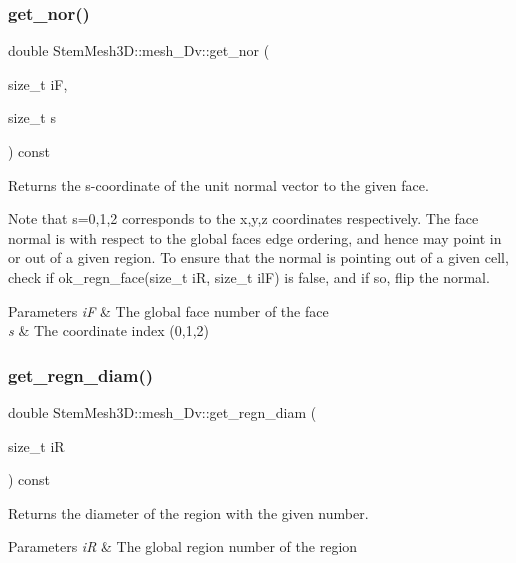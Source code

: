 \subsubsection{\texorpdfstring{get\+\_\+nor()}{get\_nor()}}
{\footnotesize\ttfamily double Stem\+Mesh3\+D\+::mesh\+\_\+Dv\+::get\+\_\+nor (\begin{DoxyParamCaption}\item[{size\+\_\+t}]{iF,  }\item[{size\+\_\+t}]{s }\end{DoxyParamCaption}) const}



Returns the s-\/coordinate of the unit normal vector to the given face. 

Note that s=0,1,2 corresponds to the x,y,z coordinates respectively. The face normal is with respect to the global face\textquotesingle{}s edge ordering, and hence may point in or out of a given region. To ensure that the normal is pointing out of a given cell, check if ok\+\_\+regn\+\_\+face(size\+\_\+t i\+R, size\+\_\+t il\+F) is false, and if so, flip the normal. 
\begin{DoxyParams}{Parameters}
{\em iF} & The global face number of the face \\
\hline
{\em s} & The coordinate index (0,1,2) \\
\hline
\end{DoxyParams}
\mbox{\label{classStemMesh3D_1_1mesh__3Dv_acc10571f29f0b076c82571fc6ae33d76}} 
\subsubsection{\texorpdfstring{get\+\_\+regn\+\_\+diam()}{get\_regn\_diam()}}
{\footnotesize\ttfamily double Stem\+Mesh3\+D\+::mesh\+\_\+Dv\+::get\+\_\+regn\+\_\+diam (\begin{DoxyParamCaption}\item[{size\+\_\+t}]{iR }\end{DoxyParamCaption}) const}



Returns the diameter of the region with the given number. 


\begin{DoxyParams}{Parameters}
{\em iR} & The global region number of the region \\
\hline
\end{DoxyParams}
\mbox{\label{classStemMesh3D_1_1mesh__3Dv_a9a60d9a26cb41402390b0acc5cbd17ec}} 
